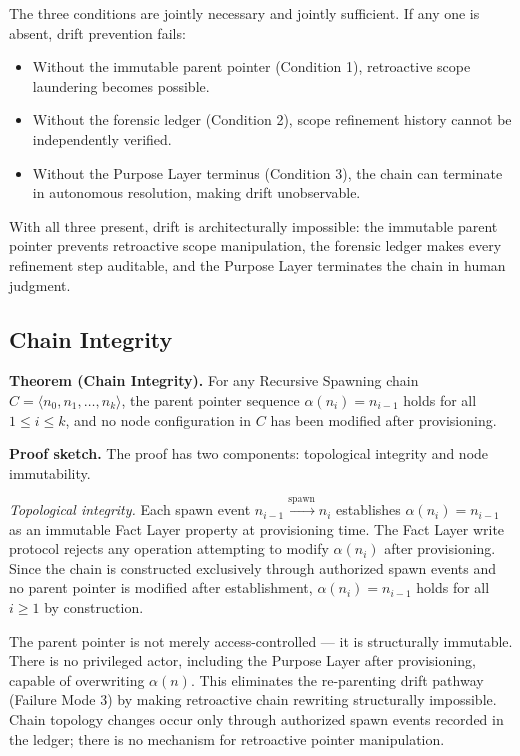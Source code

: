 \medskip
The three conditions are jointly necessary and jointly sufficient. If any one is absent, drift prevention fails:
\begin{itemize}
  \item Without the immutable parent pointer (Condition 1), retroactive scope laundering becomes possible.
  \item Without the forensic ledger (Condition 2), scope refinement history cannot be independently verified.
  \item Without the Purpose Layer terminus (Condition 3), the chain can terminate in autonomous resolution, making drift unobservable.
\end{itemize}
With all three present, drift is architecturally impossible: the immutable parent pointer prevents retroactive scope manipulation, the forensic ledger makes every refinement step auditable, and the Purpose Layer terminates the chain in human judgment.

\subsection{Chain Integrity}
\label{sec:rs-chain-integrity}

\medskip
\noindent\textbf{Theorem (Chain Integrity).}
For any Recursive Spawning chain $C = \langle n_0, n_1, \ldots, n_k \rangle$, the parent pointer sequence $\alpha(n_i) = n_{i-1}$ holds for all $1 \leq i \leq k$, and no node configuration in $C$ has been modified after provisioning.

\medskip
\noindent\textbf{Proof sketch.} The proof has two components: topological integrity and node immutability.

\medskip
\textit{Topological integrity.}
Each spawn event $n_{i-1} \xrightarrow{\mathrm{spawn}} n_i$ establishes $\alpha(n_i) = n_{i-1}$ as an immutable Fact Layer property at provisioning time. The Fact Layer write protocol rejects any operation attempting to modify $\alpha(n_i)$ after provisioning. Since the chain is constructed exclusively through authorized spawn events and no parent pointer is modified after establishment, $\alpha(n_i) = n_{i-1}$ holds for all $i \geq 1$ by construction.

The parent pointer is not merely access-controlled — it is structurally immutable. There is no privileged actor, including the Purpose Layer after provisioning, capable of overwriting $\alpha(n)$. This eliminates the re-parenting drift pathway (Failure Mode 3) by making retroactive chain rewriting structurally impossible. Chain topology changes occur only through authorized spawn events recorded in the ledger; there is no mechanism for retroactive pointer manipulation.

